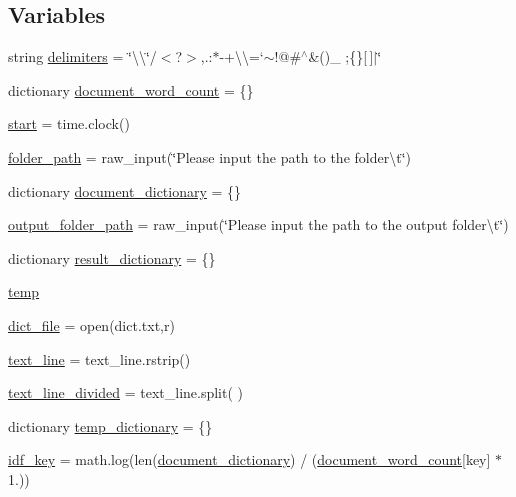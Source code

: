 \subsection*{Variables}
\begin{DoxyCompactItemize}
\item 
string \hyperlink{namespacediff_a46e2544bf0f797b8d42f4985d4b9bf0a}{delimiters} = \char`\"{}\textbackslash{}\textquotesingle{}\textbackslash{}\char`\"{}/$<$?$>$,.\+:$\ast$-\/+\textbackslash{}\textbackslash{}=`$\sim$!@\#$^\wedge$\&()\+\_\+ ;\{\}\mbox{[}$\,$\mbox{]}$\vert$\char`\"{}
\item 
dictionary \hyperlink{namespacediff_af16edaaafe4787892cb925870fd0d108}{document\+\_\+word\+\_\+count} = \{\}
\item 
\hyperlink{namespacediff_ac1dbbabcf481dbdd8253f435c6841b59}{start} = time.\+clock()
\item 
\hyperlink{namespacediff_adccd64c100d50ed0e87d46c33e8636eb}{folder\+\_\+path} = raw\+\_\+input(\char`\"{}Please input the path to the folder\textbackslash{}t\char`\"{})
\item 
dictionary \hyperlink{namespacediff_a7d02a567fcd601900d3960bef0191cea}{document\+\_\+dictionary} = \{\}
\item 
\hyperlink{namespacediff_aed454348ccff9ceb835a6c22de15fa95}{output\+\_\+folder\+\_\+path} = raw\+\_\+input(\char`\"{}Please input the path to the output folder\textbackslash{}t\char`\"{})
\item 
dictionary \hyperlink{namespacediff_a08d29f91abd1bc75aa7d8ecb3aa39c91}{result\+\_\+dictionary} = \{\}
\item 
\hyperlink{namespacediff_a9b7319edd5fe67e6804984652b758844}{temp}
\item 
\hyperlink{namespacediff_a1c4dd03a1a71df999349462c9dd9994d}{dict\+\_\+file} = open(\textquotesingle{}dict.\+txt\textquotesingle{},\textquotesingle{}r\textquotesingle{})
\item 
\hyperlink{namespacediff_afec29e46f49378a5b7b3495eecdb5e55}{text\+\_\+line} = text\+\_\+line.\+rstrip()
\item 
\hyperlink{namespacediff_ac8b8b94593712a4b907001ab1fa122c7}{text\+\_\+line\+\_\+divided} = text\+\_\+line.\+split(\textquotesingle{} \textquotesingle{})
\item 
dictionary \hyperlink{namespacediff_aca04823d91158ba2b053d46e3550516d}{temp\+\_\+dictionary} = \{\}
\item 
\hyperlink{namespacediff_a1798972d3d6361a79c16d8470bf3471d}{idf\+\_\+key} = math.\+log(len(\hyperlink{namespacediff_a7d02a567fcd601900d3960bef0191cea}{document\+\_\+dictionary}) / (\hyperlink{namespacediff_af16edaaafe4787892cb925870fd0d108}{document\+\_\+word\+\_\+count}\mbox{[}key\mbox{]} $\ast$ 1.))

\end{DoxyCompactItemize}
